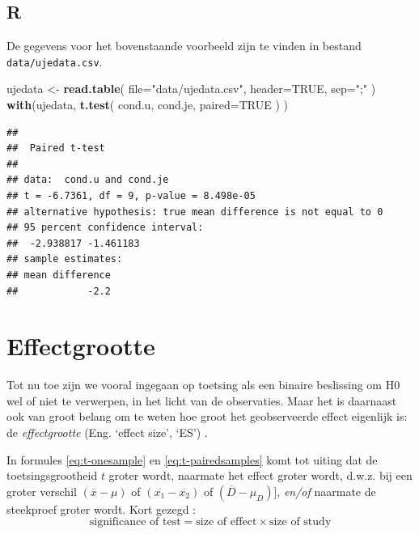 \documentclass[
]{book}
\newenvironment{Shaded}{\begin{snugshade}}{\end{snugshade}}
\newcommand{\AttributeTok}[1]{\textcolor[rgb]{0.13,0.29,0.53}{#1}}
\newcommand{\ConstantTok}[1]{\textcolor[rgb]{0.56,0.35,0.01}{#1}}
\newcommand{\FunctionTok}[1]{\textcolor[rgb]{0.13,0.29,0.53}{\textbf{#1}}}
\newcommand{\NormalTok}[1]{#1}
\newcommand{\OtherTok}[1]{\textcolor[rgb]{0.56,0.35,0.01}{#1}}
\newcommand{\StringTok}[1]{\textcolor[rgb]{0.31,0.60,0.02}{#1}}
\begin{document}
\subsection{R}\label{sec:R-ttoets-gepaard}

De gegevens voor het bovenstaande voorbeeld zijn te vinden in bestand
\texttt{data/ujedata.csv}.

\begin{Shaded}
\begin{Highlighting}[]
\NormalTok{ujedata }\OtherTok{\textless{}{-}} \FunctionTok{read.table}\NormalTok{( }\AttributeTok{file=}\StringTok{"data/ujedata.csv"}\NormalTok{, }\AttributeTok{header=}\ConstantTok{TRUE}\NormalTok{, }\AttributeTok{sep=}\StringTok{";"}\NormalTok{ )}
\FunctionTok{with}\NormalTok{(ujedata, }\FunctionTok{t.test}\NormalTok{( cond.u, cond.je, }\AttributeTok{paired=}\ConstantTok{TRUE}\NormalTok{ ) )}
\end{Highlighting}
\end{Shaded}

\begin{verbatim}
## 
##  Paired t-test
## 
## data:  cond.u and cond.je
## t = -6.7361, df = 9, p-value = 8.498e-05
## alternative hypothesis: true mean difference is not equal to 0
## 95 percent confidence interval:
##  -2.938817 -1.461183
## sample estimates:
## mean difference 
##            -2.2
\end{verbatim}

\section{Effectgrootte}\label{sec:ttoets-effectgrootte}

Tot nu toe zijn we vooral ingegaan op toetsing als een binaire
beslissing om H0 wel of niet te verwerpen, in het licht van de
observaties. Maar het is daarnaast ook van groot belang om te weten hoe
groot het geobserveerde effect eigenlijk is: de \emph{effectgrootte} (Eng.
`effect size', `ES') \citep{Cohen88, Thom02, Naka07}.

In formules \eqref{eq:t-onesample} en \eqref{eq:t-pairedsamples} komt tot
uiting dat de toetsingsgrootheid \(t\) groter wordt, naarmate het effect
groter wordt, d.w.z. bij een groter verschil \((\overline{x}-\mu)\) of
\((\overline{x_1}-\overline{x_2})\) of \((\overline{D}-\mu_D)\){]}, \emph{en/of}
naarmate de steekproef groter wordt. Kort gezegd \citep[ p.338, formule
11.10]{Rose08}:
\begin{equation}
  \label{eq:Rose08}
    \textrm{significance of test} = 
    \textrm{size of effect} \times \textrm{size of study}
\end{equation}
\end{document}
